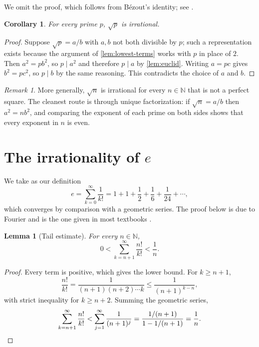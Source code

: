 \documentclass[11pt]{article}
\theoremstyle{plain}
\newtheorem{lemma}[theorem]{Lemma}
\newtheorem{corollary}[theorem]{Corollary}
\theoremstyle{definition}
\theoremstyle{remark}
\newtheorem{remark}[theorem]{Remark}
\newcommand{\N}{\mathbb{N}}
\begin{document}
We omit the proof, which follows from B\'ezout's identity; see \cite[Theorem~3]{hardywright2008}.

\begin{corollary}
\label{cor:sqrtp}
For every prime $p$, $\sqrt{p}$ is irrational.
\end{corollary}

\begin{proof}
Suppose $\sqrt{p} = a/b$ with $a, b$ not both divisible by $p$; such a representation exists because the argument of \cref{lem:lowest-terms} works with $p$ in place of $2$. Then $a^2 = p b^2$, so $p \mid a^2$ and therefore $p \mid a$ by \cref{lem:euclid}. Writing $a = pc$ gives $b^2 = p c^2$, so $p \mid b$ by the same reasoning. This contradicts the choice of $a$ and $b$.
\end{proof}

\begin{remark}
More generally, $\sqrt{n}$ is irrational for every $n \in \N$ that is not a perfect square. The cleanest route is through unique factorization: if $\sqrt{n} = a/b$ then $a^2 = n b^2$, and comparing the exponent of each prime on both sides shows that every exponent in $n$ is even.
\end{remark}

\section{The irrationality of \texorpdfstring{$e$}{e}}
\label{sec:e}

We take as our definition
\begin{equation}
  e = \sum_{k=0}^{\infty} \frac{1}{k!} = 1 + 1 + \frac{1}{2} + \frac{1}{6} + \frac{1}{24} + \cdots,
  \label{eq:e-series}
\end{equation}
which converges by comparison with a geometric series. The proof below is due to Fourier and is the one given in most textbooks \cite{aigner2018}.

\begin{lemma}[Tail estimate]
\label{lem:tail}
For every $n \in \N$,
\[
  0 < \sum_{k=n+1}^{\infty} \frac{n!}{k!} < \frac{1}{n}.
\]
\end{lemma}

\begin{proof}
Every term is positive, which gives the lower bound. For $k \ge n + 1$,
\[
  \frac{n!}{k!} = \frac{1}{(n+1)(n+2)\cdots k} \le \frac{1}{(n+1)^{k-n}},
\]
with strict inequality for $k \ge n + 2$. Summing the geometric series,
\[
  \sum_{k=n+1}^{\infty} \frac{n!}{k!} < \sum_{j=1}^{\infty} \frac{1}{(n+1)^j} = \frac{1/(n+1)}{1 - 1/(n+1)} = \frac{1}{n}. \qedhere
\]
\end{proof}
\end{document}
